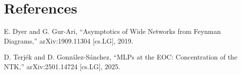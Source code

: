 \documentclass[11pt,a4paper]{article}
\theoremstyle{definition}
\begin{document}
\newpage





\appendix
\section{References}

E. Dyer and G. Gur-Ari,
``Asymptotics of Wide Networks from Feynman Diagrams,''
arXiv:1909.11304 [cs.LG], 2019.

D. Terjék and D. González-Sánchez,
``MLPs at the EOC: Concentration of the NTK,''
arXiv:2501.14724 [cs.LG], 2025.
\end{document}
